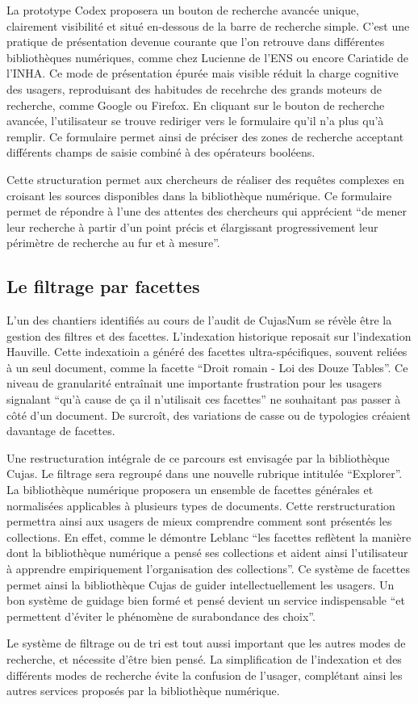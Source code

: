 La prototype Codex proposera un bouton de recherche avancée unique, clairement visibilité et situé en-dessous de la barre de recherche simple. C'est une pratique de présentation devenue courante que l'on retrouve dans différentes bibliothèques numériques, comme chez Lucienne de l'ENS ou encore Cariatide de l'INHA. Ce mode de présentation épurée mais visible réduit la charge cognitive des usagers, reproduisant des habitudes de recehrche des grands moteurs de recherche, comme Google ou Firefox. En cliquant sur le bouton de recherche avancée, l'utilisateur se trouve rediriger vers le formulaire qu'il n'a plus qu'à remplir. Ce formulaire permet ainsi de préciser des zones de recherche acceptant différents champs de saisie combiné à des opérateurs booléens.

Cette structuration permet aux chercheurs de réaliser des requêtes complexes en croisant les sources disponibles dans la bibliothèque numérique. Ce formulaire permet de répondre à l'une des attentes des chercheurs qui apprécient \enquote{de mener leur recherche à partir d'un point précis et élargissant progressivement leur périmètre de recherche au fur et à mesure}.

\subsection{Le filtrage par facettes}
L'un des chantiers identifiés au cours de l'audit de CujasNum se révèle être la gestion des filtres et des facettes. L'indexation historique reposait sur l'indexation Hauville. Cette indexatioin a généré des facettes ultra-spécifiques, souvent reliées à un seul document, comme la facette \enquote{Droit romain - Loi des Douze Tables}. Ce niveau de granularité entraînait une importante frustration pour les usagers signalant \enquote{qu'à cause de ça il n'utilisait ces facettes} ne souhaitant pas passer à côté d'un document. De surcroît, des variations de casse ou de typologies créaient davantage de facettes.

Une restructuration intégrale de ce parcours est envisagée par la bibliothèque Cujas. Le filtrage sera regroupé dans une nouvelle rubrique intitulée \enquote{Explorer}. La bibliothèque numérique proposera un ensemble de facettes générales et normalisées applicables à plusieurs types de documents. Cette rerstructuration permettra ainsi aux usagers de mieux comprendre comment sont présentés les collections. En effet, comme le démontre Leblanc \enquote{les facettes reflètent la manière dont la bibliothèque numérique a pensé ses collections et aident ainsi l'utilisateur à apprendre empiriquement l'organisation des collections}. Ce système de facettes permet ainsi la bibliothèque Cujas de guider intellectuellement les usagers. Un bon système de guidage bien formé et pensé devient un service indispensable \enquote{et permettent d'éviter le phénomène de surabondance des choix}.

Le système de filtrage ou de tri est tout aussi important que les autres modes de recherche, et nécessite d'être bien pensé. La simplification de l'indexation et des différents modes de recherche évite la confusion de l'usager, complétant ainsi les autres services proposés par la bibliothèque numérique. 